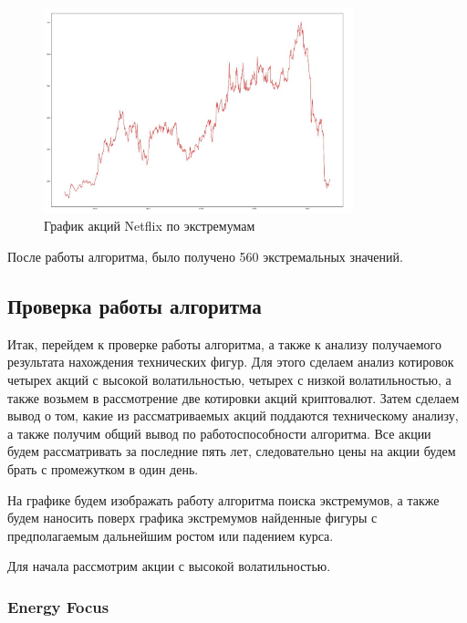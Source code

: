 \documentclass[bachelor, och, coursework]{SCWorks}
\begin{document}
    \begin{figure}[H]
        \centering
        \includegraphics[width=0.8\textwidth]{pic/NetflixExtrema.jpg}
        \caption{График акций Netflix по экстремумам}
    \end{figure}
    
    После работы алгоритма, было получено 560 экстремальных значений.


    \subsection{Проверка работы алгоритма}
    Итак, перейдем к проверке работы алгоритма, а также к анализу получаемого
    результата нахождения технических фигур. Для этого сделаем анализ котировок
    четырех акций с высокой волатильностью, четырех с низкой волатильностью, а
    также возьмем в рассмотрение две котировки акций криптовалют. Затем сделаем
    вывод о том, какие из рассматриваемых акций поддаются техническому анализу,
    а также получим общий вывод по работоспособности алгоритма. Все акции будем
    рассматривать за последние пять лет, следовательно цены на акции будем брать
    с промежутком в один день.
    
    На графике будем изображать работу алгоритма поиска экстремумов, а также
    будем наносить поверх графика экстремумов найденные фигуры с предполагаемым 
    дальнейшим ростом или падением курса.
    
    Для начала рассмотрим акции с высокой волатильностью.
    
    \subsubsection{Energy Focus}
    
\end{document}

